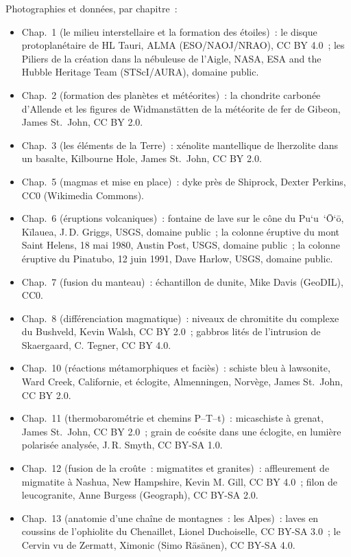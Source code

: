 \bigskip
\noindent Photographies et données, par chapitre~:
\begin{itemize}\small
  \item Chap.~1 (le milieu interstellaire et la formation des étoiles)~: le disque protoplanétaire de HL Tauri, ALMA (ESO/NAOJ/NRAO), CC BY 4.0~; les Piliers de la création dans la nébuleuse de l'Aigle, NASA, ESA and the Hubble Heritage Team (STScI/AURA), domaine public.
  \item Chap.~2 (formation des planètes et météorites)~: la chondrite carbonée d'Allende et les figures de Widmanstätten de la météorite de fer de Gibeon, James St.~John, CC BY 2.0.
  \item Chap.~3 (les éléments de la Terre)~: xénolite mantellique de lherzolite dans un basalte, Kilbourne Hole, James St.~John, CC BY 2.0.
  \item Chap.~5 (magmas et mise en place)~: dyke près de Shiprock, Dexter Perkins, CC0 (Wikimedia Commons).
  \item Chap.~6 (éruptions volcaniques)~: fontaine de lave sur le cône du Pu`u~`\=O`\=o, Kīlauea, J.\,D. Griggs, USGS, domaine public~; la colonne éruptive du mont Saint Helens, 18 mai 1980, Austin Post, USGS, domaine public~; la colonne éruptive du Pinatubo, 12 juin 1991, Dave Harlow, USGS, domaine public.
  \item Chap.~7 (fusion du manteau)~: échantillon de dunite, Mike Davis (GeoDIL), CC0.
  \item Chap.~8 (différenciation magmatique)~: niveaux de chromitite du complexe du Bushveld, Kevin Walsh, CC BY 2.0~; gabbros lités de l'intrusion de Skaergaard, C. Tegner, CC BY 4.0.
  \item Chap.~10 (réactions métamorphiques et faciès)~: schiste bleu à lawsonite, Ward Creek, Californie, et éclogite, Almenningen, Norvège, James St.~John, CC BY 2.0.
  \item Chap.~11 (thermobarométrie et chemins P--T--t)~: micaschiste à grenat, James St.~John, CC BY 2.0~; grain de coésite dans une éclogite, en lumière polarisée analysée, J.\,R. Smyth, CC BY-SA 1.0.
  \item Chap.~12 (fusion de la croûte~: migmatites et granites)~: affleurement de migmatite à Nashua, New Hampshire, Kevin M. Gill, CC BY 4.0~; filon de leucogranite, Anne Burgess (Geograph), CC BY-SA 2.0.
  \item Chap.~13 (anatomie d'une chaîne de montagnes~: les Alpes)~: laves en coussins de l'ophiolite du Chenaillet, Lionel Duchoiselle, CC BY-SA 3.0~; le Cervin vu de Zermatt, Ximonic (Simo Räsänen), CC BY-SA 4.0.

\end{itemize}
